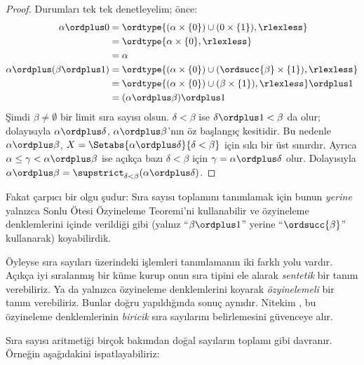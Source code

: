 \documentclass[../../../include/open-logic-section]{subfiles}
\begin{document}
\begin{proof}
Durumları tek tek denetleyelim; önce:
\begin{align*}
	\alpha \ordplus 0
	&= \ordtype{(\alpha\times\{0\})\cup(0\times\{1\}),\rlexless}\\
	&= \ordtype{\alpha\times\{0\},\rlexless}\\
	&= \alpha\\
	\alpha \ordplus (\beta\ordplus 1)
	&= \ordtype{(\alpha\times\{0\})\cup(\ordsucc{\beta}\times\{1\}),\rlexless}\\
	&= \ordtype{(\alpha\times\{0\})\cup(\beta\times\{1\}),\rlexless}\ordplus 1\\
	&= (\alpha\ordplus\beta)\ordplus 1
\end{align*}
Şimdi $\beta\neq\emptyset$ bir limit sıra sayısı olsun. $\delta<\beta$ ise
$\delta\ordplus 1<\beta$ da olur; dolayısıyla
$\alpha\ordplus\delta$, $\alpha\ordplus\beta$'nın öz başlangıç kesitidir.
Bu nedenle $\alpha\ordplus\beta$,
$X=\Setabs{\alpha\ordplus\delta}{\delta<\beta}$ için sıkı bir üst
sınırdır. Ayrıca $\alpha\leq\gamma<\alpha\ordplus\beta$ ise açıkça bazı
$\delta<\beta$ için $\gamma=\alpha\ordplus\delta$ olur. Dolayısıyla
$\alpha\ordplus\beta=\supstrict_{\delta<\beta}(\alpha\ordplus\delta)$.
\end{proof}

Fakat çarpıcı bir olgu şudur: Sıra sayısı toplamını tanımlamak için bunun
\emph{yerine} yalnızca Sonlu Ötesi Özyineleme Teoremi'ni kullanabilir ve
özyineleme denklemlerini  içinde verildiği gibi
(yalnız ``$\beta\ordplus 1$'' yerine ``$\ordsucc{\beta}$'' kullanarak)
koyabilirdik.

Öyleyse sıra sayıları üzerindeki işlemleri tanımlamanın iki farklı yolu
vardır. Açıkça iyi sıralanmış bir küme kurup onun sıra tipini ele alarak
\emph{sentetik} bir tanım verebiliriz. Ya da yalnızca özyineleme denklemlerini
koyarak 
\emph{özyinelemeli} bir tanım verebiliriz. Bunlar doğru yapıldığında
sonuç aynıdır. Nitekim
, bu özyineleme
denklemlerinin 
\emph{biricik} sıra sayılarını belirlemesini güvenceye alır.

Sıra sayısı aritmetiği birçok bakımdan doğal sayıların toplamı gibi davranır.
Örneğin aşağıdakini ispatlayabiliriz:
\end{document}
